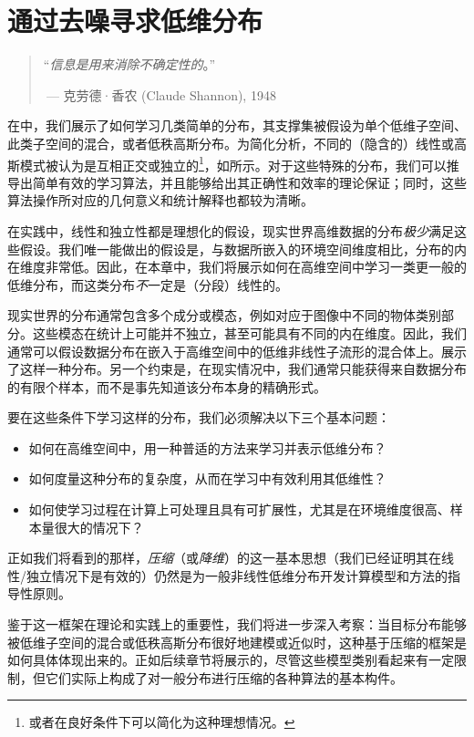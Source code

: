 \documentclass[../../book-main_zh.tex]{subfiles}
\begin{document}
\chapter{通过去噪寻求低维分布}
\label{ch:denoising}

\begin{quote}
    \hfill  ``{\textit{信息是用来消除不确定性的}}。''

    \(~\)\hfill --- 克劳德·香农 (Claude Shannon), 1948
\end{quote}
\vspace{5mm}

在中，我们展示了如何学习几类简单的分布，其支撑集被假设为单个低维子空间、此类子空间的混合，或者低秩高斯分布。为简化分析，不同的（隐含的）线性或高斯模式被认为是互相正交或独立的\footnote{或者在良好条件下可以简化为这种理想情况。}，如所示。对于这些特殊的分布，我们可以推导出简单有效的学习算法，并且能够给出其正确性和效率的理论保证；同时，这些算法操作所对应的几何意义和统计解释也都较为清晰。

在实践中，线性和独立性都是理想化的假设，现实世界高维数据的分布\textit{极少}满足这些假设。我们唯一能做出的假设是，与数据所嵌入的环境空间维度相比，分布的内在维度非常低。因此，在本章中，我们将展示如何在高维空间中学习一类更一般的低维分布，而这类分布\textit{不}一定是（分段）线性的。

现实世界的分布通常包含多个成分或模态，例如对应于图像中不同的物体类别部分。这些模态在统计上可能并不独立，甚至可能具有不同的内在维度。因此，我们通常可以假设数据分布在嵌入于高维空间中的低维非线性子流形的混合体上。展示了这样一种分布。另一个约束是，在现实情况中，我们通常只能获得来自数据分布的有限个样本，而不是事先知道该分布本身的精确形式。

要在这些条件下学习这样的分布，我们必须解决以下三个基本问题：
\begin{itemize}
    \item 如何在高维空间中，用一种普适的方法来学习并表示低维分布？
    \item 如何度量这种分布的复杂度，从而在学习中有效利用其低维性？
    \item 如何使学习过程在计算上可处理且具有可扩展性，尤其是在环境维度很高、样本量很大的情况下？
\end{itemize}
正如我们将看到的那样，\textit{压缩}（或\textit{降维}）的这一基本思想（我们已经证明其在线性/独立情况下是有效的）仍然是为一般非线性低维分布开发计算模型和方法的指导性原则。

鉴于这一框架在理论和实践上的重要性，我们将进一步深入考察：当目标分布能够被低维子空间的混合或低秩高斯分布很好地建模或近似时，这种基于压缩的框架是如何具体体现出来的。正如后续章节将展示的，尽管这些模型类别看起来有一定限制，但它们实际上构成了对一般分布进行压缩的各种算法的基本构件。
\end{document}
